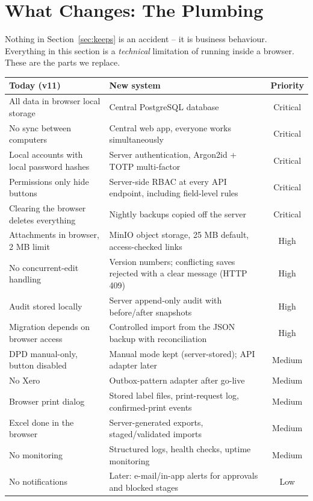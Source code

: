 \section{What Changes: The Plumbing}\label{sec:changes}

\begin{plainwords}
Nothing in Section~\ref{sec:keeps} is an accident -- it is business behaviour. Everything
in this section is a \emph{technical} limitation of running inside a browser. These are
the parts we replace.
\end{plainwords}

\noindent
\begin{tabularx}{\textwidth}{@{}p{4.6cm} X c@{}}
\toprule
\textbf{Today (v11)} & \textbf{New system} & \textbf{Priority} \\
\midrule
All data in browser local storage & Central PostgreSQL database & Critical \\
No sync between computers & Central web app, everyone works simultaneously & Critical \\
Local accounts with local password hashes & Server authentication, Argon2id + TOTP
  multi-factor & Critical \\
Permissions only hide buttons & Server-side RBAC at every API endpoint, including
  field-level rules & Critical \\
Clearing the browser deletes everything & Nightly backups copied off the server &
  Critical \\
Attachments in browser, 2 MB limit & MinIO object storage, 25 MB default, access-checked
  links & High \\
No concurrent-edit handling & Version numbers; conflicting saves rejected with a clear
  message (HTTP 409) & High \\
Audit stored locally & Server append-only audit with before/after snapshots & High \\
Migration depends on browser access & Controlled import from the JSON backup with
  reconciliation & High \\
DPD manual-only, button disabled & Manual mode kept (server-stored); API adapter later &
  Medium \\
No Xero & Outbox-pattern adapter after go-live & Medium \\
Browser print dialog & Stored label files, print-request log, confirmed-print events &
  Medium \\
Excel done in the browser & Server-generated exports, staged/validated imports &
  Medium \\
No monitoring & Structured logs, health checks, uptime monitoring & Medium \\
No notifications & Later: e-mail/in-app alerts for approvals and blocked stages & Low \\
\bottomrule
\end{tabularx}
